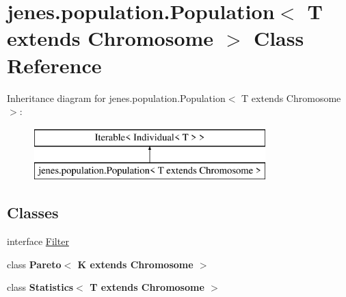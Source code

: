 \hypertarget{classjenes_1_1population_1_1_population_3_01_t_01extends_01_chromosome_01_4}{\section{jenes.\-population.\-Population$<$ T extends Chromosome $>$ Class Reference}
\label{classjenes_1_1population_1_1_population_3_01_t_01extends_01_chromosome_01_4}
}
Inheritance diagram for jenes.\-population.\-Population$<$ T extends Chromosome $>$\-:\begin{figure}[H]
\begin{center}
\leavevmode
\includegraphics[height=2.000000cm]{classjenes_1_1population_1_1_population_3_01_t_01extends_01_chromosome_01_4}
\end{center}
\end{figure}
\subsection*{Classes}
\begin{DoxyCompactItemize}
\item 
interface \hyperlink{interfacejenes_1_1population_1_1_population_3_01_t_01extends_01_chromosome_01_4_1_1_filter}{Filter}
\item 
class {\bfseries Pareto$<$ K extends Chromosome $>$}
\item 
class {\bfseries Statistics$<$ T extends Chromosome $>$}
\end{DoxyCompactItemize}
